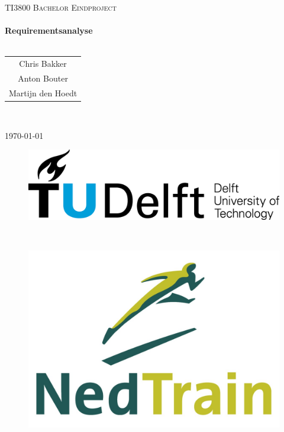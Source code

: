 
\usepackage{tikz}

\begin{titlepage}
\center
\textsc{\huge TI3800 Bachelor Eindproject}\\[1.5cm]
\HRule \\[0.4cm]
{\Huge \bfseries Requirementsanalyse}\\[0.4cm]
\HRule \\[1.5cm]
\begin{Large}
\begin{tabular}{c}
Chris Bakker\\
Anton Bouter\\
Martijn den Hoedt\\
\end{tabular}\\[2cm]
\end{Large}

{\large \today}\\[2cm]

\begin{figure}[b]
\centering
\begin{minipage}{0.4\textwidth}
\begin{flushleft}
\includegraphics[width=0.9\linewidth]{../images/TU_Delft_logo.png}
\end{flushleft}
\end{minipage}
~
\begin{minipage}{0.4\textwidth}
\begin{flushright}
\includegraphics[width=0.9\linewidth]{../images/NedTrain_logo.png}
\end{flushright}
\end{minipage}\\[2cm]
\end{figure}

\vfill

\end{titlepage}

